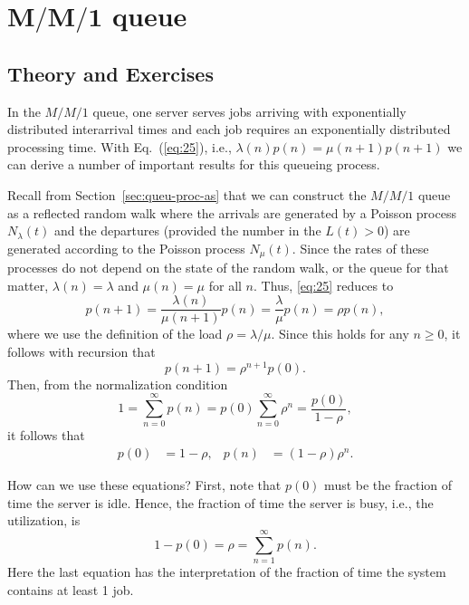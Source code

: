 \section
[$M/M/1$ queue]
{$\mathbf{M/M/1}$ queue}
\label{sec:mm1}


\subsection*{Theory and Exercises}


In the $M/M/1$ queue, one server serves jobs arriving with
exponentially distributed interarrival times and each job requires an
exponentially distributed processing time.  With Eq.~(\ref{eq:25}),
i.e., $\lambda(n)p(n)= \mu(n+1)p(n+1)$ we can derive a number of
important results for this queueing process.

Recall from Section~\ref{sec:queu-proc-as} that we can construct the
$M/M/1$ queue as a reflected random walk where the arrivals are
generated by a Poisson process $N_\lambda(t)$ and the departures
(provided the number in the $L(t)>0$) are generated according to the
Poisson process $N_\mu(t)$. Since the rates of these processes do not
depend on the state of the random walk, or the queue for that matter,
$\lambda(n)=\lambda$ and $\mu(n)=\mu$ for all $n$. Thus, \eqref{eq:25}
reduces to
\begin{equation*}
  p(n+1) = \frac{\lambda(n)}{\mu(n+1)} p(n) = \frac{\lambda}{\mu} p(n) = \rho p(n),
\end{equation*}
where we use the definition of the load $\rho=\lambda/\mu$. Since this
holds for any $n\geq 0$, it follows with recursion that
\begin{equation*}
  p(n+1) = \rho^{n+1} p(0).
\end{equation*}
Then, from the normalization condition
\begin{equation*}
1=  \sum_{n=0}^\infty p(n) = p(0)\sum_{n=0}^\infty \rho^n = \frac{p(0)}{1-\rho},
\end{equation*}
it follows that
\begin{align}\label{eq:23}
p(0) &=1-\rho, &   p(n) &=  (1-\rho)\rho^{n}.
\end{align}

How can we use these equations? First, note that $p(0)$ must be the
fraction of time the server is idle. Hence, the fraction of time the
server is busy, i.e., the utilization, is
\begin{equation*}
  1-p(0) = \rho = \sum_{n=1}^\infty p(n).
\end{equation*}
Here the last equation has the interpretation of the fraction of time
the system contains at least 1 job. 


